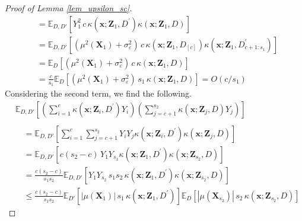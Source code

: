 \documentclass[letterpaper,10pt]{article}
\numberwithin{equation}{section}
\numberwithin{thm}{section}
\numberwithin{lem}{section}
\numberwithin{cor}{section}
\newcommand{\E}{\mathbb{E}}
\newcommand{\1}{\mathbbm{1}}
\begin{document}
\begin{proof}[Proof of Lemma \ref{lem_upsilon_sc}]
\begin{equation}
\begin{aligned}
			 & = \E_{D, D'}\left[Y_{1}^2 \, c \, \kappa(\mathbf{x}; \mathbf{Z}_1, D^{\prime})\kappa(\mathbf{x}; \mathbf{Z}_1, D)\right]                                                                     \\
			 & = \E_{D, D'}\left[\left(\mu^2(\mathbf{X}_{1}) + \sigma^2_{\varepsilon}\right) \, c \, \kappa(\mathbf{x}; \mathbf{Z}_1, D_{[c]})\kappa(\mathbf{x}; \mathbf{Z}_1, D^{\prime}_{c+1:s_1})\right] \\
			 & = \E_{D}\left[\left(\mu^2(\mathbf{X}_{1}) + \sigma^2_{\varepsilon}\right) \, c \, \kappa(\mathbf{x}; \mathbf{Z}_1, D)\right]                                                                 \\
			 & = \frac{c}{s_1} \E_{D}\left[\left(\mu^2(\mathbf{X}_{1}) + \sigma^2_{\varepsilon}\right) \, s_1 \, \kappa(\mathbf{x}; \mathbf{Z}_1, D)\right]
			= O(c/s_1)
		\end{aligned}
	\end{equation}
	Considering the second term, we find the following.
	\begin{equation}
		\begin{aligned}
			 & \E_{D, D'}\left[\left(\sum_{i = 1}^{c}\kappa(\mathbf{x}; \mathbf{Z}_i, D^{\prime}) Y_i\right)
			\left(\sum_{j = c+1}^{s_2} \kappa(\mathbf{x}; \mathbf{Z}_j, D) Y_j\right)\right]                                                                                          \\                                                                                                                                                                         \\
			 & \quad = \E_{D, D'}\left[\sum_{i = 1}^{c}\sum_{j = c+1}^{s_2}Y_i Y_j \kappa(\mathbf{x}; \mathbf{Z}_i, D^{\prime})\kappa(\mathbf{x}; \mathbf{Z}_j, D)\right]             \\
			 & \quad = \E_{D, D'}\left[c(s_2 - c) \, Y_1 Y_{s_1} \kappa(\mathbf{x}; \mathbf{Z}_1, D^{\prime})\kappa(\mathbf{x}; \mathbf{Z}_{s_2}, D)\right]                           \\
			 & \quad = \frac{c (s_2 - c)}{s_1 s_2}\E_{D, D'}\left[Y_1 Y_{s_2} \, s_1 s_2 \,\kappa(\mathbf{x}; \mathbf{Z}_1, D^{\prime})\kappa(\mathbf{x}; \mathbf{Z}_{s_2}, D)\right] \\
			 & \quad \leq \frac{c (s_2 - c)}{s_1 s_2}
			\E_{D'}\left[|\mu(\mathbf{X}_1)| \, s_1  \,\kappa(\mathbf{x}; \mathbf{Z}_1, D^{\prime})\right]
			\E_{D}\left[|\mu(\mathbf{X}_{s_2})| \, s_2  \,\kappa(\mathbf{x}; \mathbf{Z}_{s_2}, D)\right]

\end{aligned}
\end{equation}
\end{proof}
\end{document}

